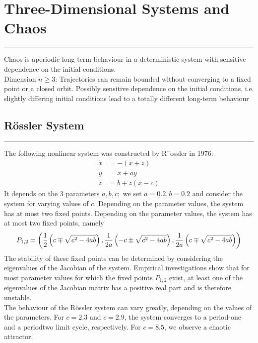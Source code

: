 \section{Three-Dimensional Systems and Chaos}
\noindent\rule[\linienAbstand]{\linewidth}{\linienDickeDick}
Chaos is aperiodic long-term behaviour in a deterministic system with sensitive dependence on the initial conditions.\\

Dimension $n \geq 3$: Trajectories can remain bounded without
converging to a fixed point or a closed orbit. Possibly sensitive dependence on the initial conditions, i.e. slightly differing initial conditions lead to a totally different
long-term behaviour

\subsection{Rössler System}
\noindent\rule[\linienAbstand]{\linewidth}{\linienDicke}
The following nonlinear system was constructed by R¨ossler in 1976:
\begin{equation}
  \begin{split}
    \dot{x} &= -(x+z)\\
    \dot{y} &= x + ay\\
    \dot{z} &= b + z(x-c)
  \end{split}
\end{equation}
It depends on the 3 parameters $a, b, c;$ we set $a = 0.2, b = 0.2$ and consider the system for varying values of $c$. Depending on the parameter values, the system has at most two fixed points. Depending on the parameter values, the system has at most two fixed points, namely
\begin{equation}
  \tiny
  P_{1,2} = \left(
  \frac{1}{2} \left( c\mp \sqrt{c^2 - 4ab}\right),
  \frac{1}{2a}\left(-c\pm \sqrt{c^2 - 4ab}\right),
  \frac{1}{2a}\left( c\mp \sqrt{c^2 - 4ab}\right)
  \right)
\end{equation}
The stability of these fixed points can be determined by considering the eigenvalues of the Jacobian of the system. Empirical investigations show that for most parameter values for which the fixed points $P_{1,2}$ exist, at least one of the eigenvalues of the Jacobian matrix has a positive real part and is therefore unstable.\\
The behaviour of the Rössler system can vary greatly, depending on the values of the
parameters. For $c = 2.3$ and $c = 2.9$, the system converges to a period-one and a periodtwo limit cycle, respectively. For $c = 8.5$, we observe a chaotic attractor.

